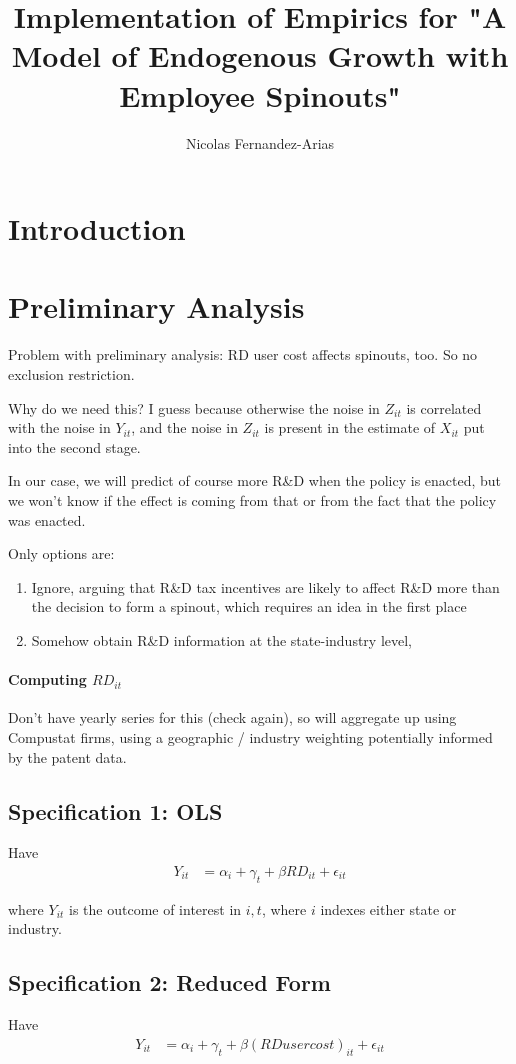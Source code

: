 \documentclass[12pt,english]{article}
\theoremstyle{remark}
\begin{document}
\title{Implementation of Empirics for "A Model of Endogenous Growth with Employee Spinouts"}
\author{Nicolas Fernandez-Arias}
\maketitle

\section{Introduction}

\section{Preliminary Analysis}

Problem with preliminary analysis: RD user cost affects spinouts, too. So no exclusion restriction. 

Why do we need this? I guess because otherwise the noise in $Z_{it}$ is correlated with the noise in $Y_{it}$, and the noise in $Z_{it}$ is present in the estimate of $X_{it}$ put into the second stage. 

In our case, we will predict of course more R\&D when the policy is enacted, but we won't know if the effect is coming from that or from the fact that the policy was enacted.

Only options are:
\begin{enumerate}
	\item Ignore, arguing that R\&D tax incentives are likely to affect R\&D more than the decision to form a spinout, which requires an idea in the first place
	\item Somehow obtain R\&D information at the state-industry level, \textsl{}
\end{enumerate}

\paragraph{Computing $RD_{it}$}

Don't have  yearly series for this (check again), so will aggregate up using Compustat firms, using a geographic / industry weighting potentially informed by the patent data.

\subsection{Specification 1: OLS}

Have
\begin{align*}
	Y_{it} &= \alpha_i + \gamma_t + \beta RD_{it} + \epsilon_{it}
\end{align*}

where $Y_{it}$ is the outcome of interest in $i,t$, where $i$ indexes either state or industry. 

\subsection{Specification 2: Reduced Form}

Have
\begin{align*}
	Y_{it} &= \alpha_i + \gamma_t + \beta (RD user cost)_{it} + \epsilon_{it}
\end{align*}
\end{document}
